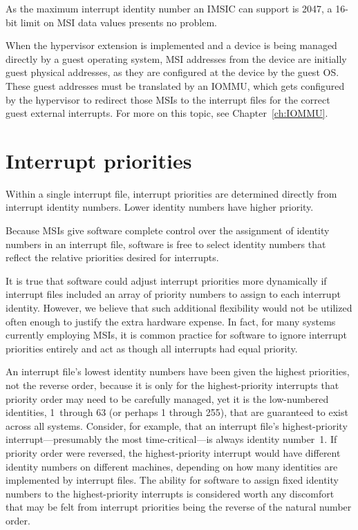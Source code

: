 \begin{commentary}
As the maximum interrupt identity number an IMSIC can support is 2047,
a \mbox{16-bit} limit on MSI data values presents no problem.
\end{commentary}

When the hypervisor extension is implemented and a device is being
managed directly by a guest operating system, MSI addresses from the
device are initially guest physical addresses, as they are configured
at the device by the guest OS.
These guest addresses must be translated by an \mbox{IOMMU}, which gets
configured by the hypervisor to redirect those MSIs to the interrupt
files for the correct guest external interrupts.
For more on this topic, see Chapter~\ref{ch:IOMMU}.

\section{Interrupt priorities}

Within a single interrupt file, interrupt priorities are determined
directly from interrupt identity numbers.
Lower identity numbers have higher priority.

\begin{commentary}
Because MSIs give software complete control over the assignment of
identity numbers in an interrupt file, software is free to select
identity numbers that reflect the relative priorities desired for
interrupts.

It is true that software could adjust interrupt priorities more
dynamically if interrupt files included an array of priority numbers to
assign to each interrupt identity.
However, we believe that such additional flexibility would not be
utilized often enough to justify the extra hardware expense.
In fact, for many systems currently employing MSIs, it is common
practice for software to ignore interrupt priorities entirely and act
as though all interrupts had equal priority.
\end{commentary}

\begin{commentary}
An interrupt file's lowest identity numbers have been given the
highest priorities, not the reverse order, because it is only for
the highest-priority interrupts that priority order may need to be
carefully managed, yet it is the low-numbered identities, 1~through 63
(or perhaps 1 through 255), that are guaranteed to exist across all
systems.
Consider, for example, that an interrupt file's highest-priority
interrupt---presumably the most time-critical---is always identity
number~1.
If priority order were reversed, the highest-priority interrupt would
have different identity numbers on different machines, depending on how
many identities are implemented by interrupt files.
The ability for software to assign fixed identity numbers to the
highest-priority interrupts is considered worth any discomfort that
may be felt from interrupt priorities being the reverse of the natural
number order.
\end{commentary}

